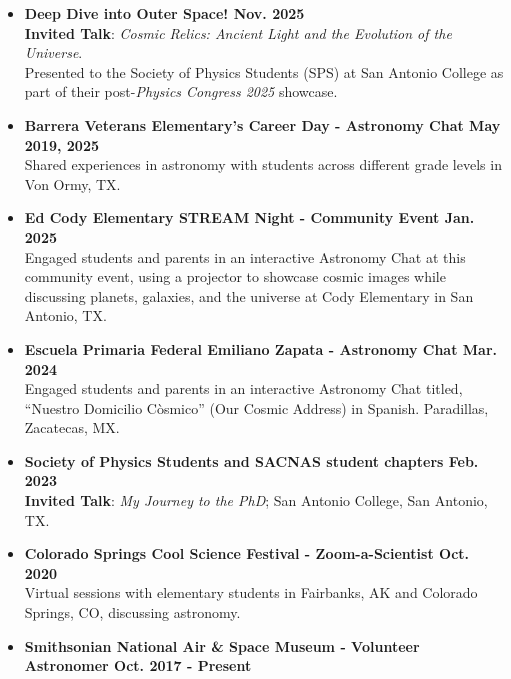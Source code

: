 \documentclass[12pt]{article}
\begin{document}
{}
\begin{itemize}
    \item \textbf{Deep Dive into Outer Space! \hfill Nov. 2025} \\
    \textbf{Invited Talk}: \textit{Cosmic Relics: Ancient Light and the Evolution of the Universe}. \\
    Presented to the Society of Physics Students (SPS) at San Antonio College as part of their post-\textit{Physics Congress 2025} showcase.
    \item \textbf{Barrera Veterans Elementary's Career Day - Astronomy Chat \hfill May 2019, 2025} \\
    Shared experiences in astronomy with students across different grade levels in Von Ormy, TX.
    \item \textbf{Ed Cody Elementary STREAM Night - Community Event \hfill Jan. 2025} \\
    Engaged students and parents in an interactive Astronomy Chat at this community event, using a projector to showcase cosmic images while discussing planets, galaxies, and the universe at Cody Elementary in San Antonio, TX.
    \item \textbf{Escuela Primaria Federal Emiliano Zapata - Astronomy Chat \hfill Mar. 2024} \\ Engaged students and parents in an interactive Astronomy Chat titled, ``Nuestro Domicilio C\`{o}smico'' (Our Cosmic Address) in Spanish. Paradillas, Zacatecas, MX.
    \item \textbf{Society of Physics Students and SACNAS student chapters \hfill Feb. 2023} \\
    \textbf{Invited Talk}: \textit{My Journey to the PhD}; San Antonio College, San Antonio, TX.
    \item \textbf{Colorado Springs Cool Science Festival - Zoom-a-Scientist \hfill Oct. 2020} \\
    Virtual sessions with elementary students in Fairbanks, AK and Colorado Springs, CO, discussing astronomy.
    \item \textbf{Smithsonian National Air \& Space Museum - Volunteer Astronomer \hfill Oct. 2017 - Present} \\

\end{itemize}
\end{document}
